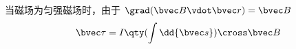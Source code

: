 当磁场为匀强磁场时，由于 $\grad (\bvec B \vdot \bvec r) = \bvec B$
\begin{equation}
\bvec \tau = I \qty(\int \dd{\bvec s}) \cross \bvec B
\end{equation}







